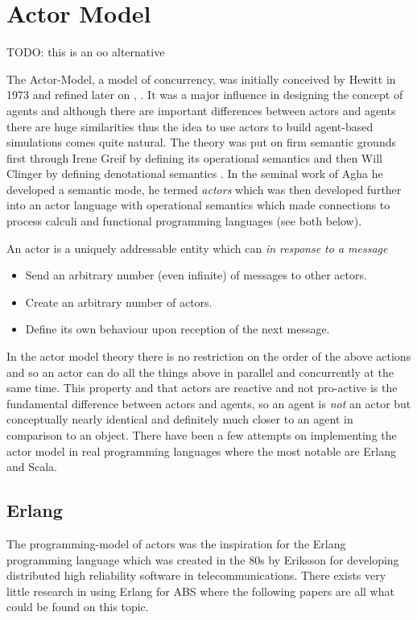 \section{Actor Model}
TODO: this is an oo alternative

The Actor-Model, a model of concurrency, was initially conceived by Hewitt in 1973 \cite{hewitt_universal_1973} and refined later on \cite{hewitt_what_2007}, \cite{hewitt_actor_2010}. It was a major influence in designing the concept of agents and although there are important differences between actors and agents there are huge similarities thus the idea to use actors to build agent-based simulations comes quite natural. The theory was put on firm semantic grounds first through Irene Greif by defining its operational semantics \cite{greif_semantics_1975} and then Will Clinger by defining denotational semantics \cite{clinger_foundations_1981}. In the seminal work of Agha \cite{agha_actors:_1986} he developed a semantic mode, he termed \textit{actors} which was then developed further \cite{agha_foundation_1997} into an actor language with operational semantics which made connections to process calculi and functional programming languages (see both below). 

An actor is a uniquely addressable entity which can \textit{in response to a message}
\begin{itemize}
	\item Send an arbitrary number (even infinite) of messages to other actors.
	\item Create an arbitrary number of actors.
	\item Define its own behaviour upon reception of the next message.
\end{itemize}

In the actor model theory there is no restriction on the order of the above actions and so an actor can do all the things above in parallel and concurrently at the same time. This property and that actors are reactive and not pro-active is the fundamental difference between actors and agents, so an agent is \textit{not} an actor but conceptually nearly identical and definitely much closer to an agent in comparison to an object. There have been a few attempts on implementing the actor model in real programming languages where the most notable are Erlang and Scala.

\subsection{Erlang}
The programming-model of actors \cite{agha_actors:_1986} was the inspiration for the Erlang programming language which was created in the 80s by Eriksson \cite{armstrong_erlang_2010} for developing distributed high reliability software in telecommunications. There exists very little research in using Erlang for ABS where the following papers are all what could be found on this topic.

